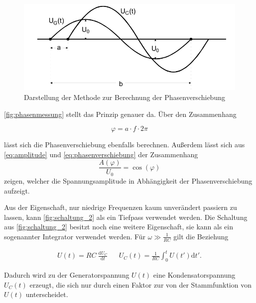 \begin{figure}
    \centering
    \includegraphics[width=\textwidth/2]{images/phasenmessung.png}
    \caption{Darstellung der Methode zur Berechnung der Phasenverschiebung  \cite{V353}}
    \label{fig:phasenmessung}
\end{figure}

\autoref{fig:phasenmessung} stellt das Prinzip genauer da. Über den Zusammenhang

\begin{equation}
    \label{eq:phasenverschiebung2}
    \varphi = a \cdot f \cdot 2\pi
\end{equation}

lässt sich die Phasenverschiebung ebenfalls berechnen.
Außerdem lässt sich aus \autoref{eq:amplitude} und \autoref{eq:phasenverschiebung} der Zusammenhang
\begin{equation}
    \label{eq:spannung_phase}
    \frac{A(\varphi)}{U_0} = \cos(\varphi)
\end{equation}
zeigen, welcher die Spannungsamplitude in Abhängigkeit der Phasenverschiebung aufzeigt.

Aus der Eigenschaft, nur niedrige Frequenzen kaum unverändert passiern zu lassen, kann \autoref{fig:schaltung_2} als ein Tiefpass verwendet werden. \cite{V353}
Die Schaltung aus \autoref{fig:schaltung_2} besitzt noch eine weitere Eigenschaft, sie kann als ein sogenannter Integrator verwendet werden. Für $\omega \gg \frac{1}{RC}$ gilt die Beziehung

\begin{align}
    \label{eq:integrator}
    U (t) = RC \: \frac{\mathrm{d} U_C}{\mathrm{d}t}  && U_C (t) = \frac{1}{RC} \int _0^t U (t') \mathrm{d} t'.
\end{align}

Dadurch wird zu der Generatorspannung $U (t)$ eine Kondensatorspannung $U_C (t)$ erzeugt, die sich nur durch einen Faktor zur von der Stammfunktion von $U(t)$ unterscheidet. \cite{V353}
